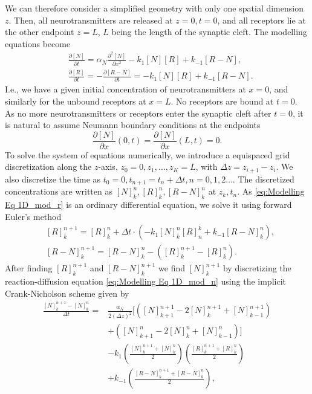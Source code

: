 \documentclass{article}
\begin{document}
We can therefore consider a simplified geometry with only one spatial dimension $z$.
Then, all neurotransmitters are released at $z = 0, t = 0$, and all receptors lie at the other endpoint $z = L$, $L$ being the length of the synaptic cleft.
The modelling equations become 
\begin{align}\label{eq:Modelling Eq 1D_mod_n}
        & \frac{\partial [N]}{\partial t} = \alpha_N \frac{\partial^2 [N]}{\partial x^2} - k_1 [N][R] + k_{-1}[R-N], \\
        \label{eq:Modelling Eq 1D_mod_r}
        &\frac{\partial [R]}{\partial t} = -\frac{\partial[R-N]}{\partial t} = -k_1 [N][R] + k_{-1}[R-N].
\end{align}
I.e., we have a given initial concentration of neurotransmitters at $x = 0$, and similarly for the unbound receptors at $x = L$.
No receptors are bound at $t = 0$.
As no more neurotransmitters or receptors enter the synaptic cleft after $t = 0$, it is natural to assume Neumann boundary conditions at the endpoints
\begin{equation}\label{eq:boundary}
        \frac{\partial [N]}{\partial x}(0, t) = \frac{\partial [N]}{\partial x} (L, t) = 0. 
\end{equation}
To solve the system of equations numerically, we introduce a equispaced grid discretization along the $z$-axis, $z_0 = 0, z_1, \hdots, z_K = L$, with $\Delta z = z_{i + 1} - z_i$.
We also discretize the time as $t_0 = 0, t_{n +1} = t_n + \Delta t, n = 0, 1, 2 \hdots$.
The discretized concentrations are written as $[N]_{k}^{n}, [R]_k^n, [R-N]_k^n$ at $z_k, t_n$.
As \eqref{eq:Modelling Eq 1D_mod_r} is an ordinary differential equation, we solve it using forward Euler's method
\begin{align*}
        &[R]_k^{n+1} = [R]_k^n + \Delta t \cdot (-k_1[N]_k^n[R]_n^k + k_{-1}[R-N]_k^n), \\
        &[R - N]_k^{n+1} = [R-N]_k^n -([R]_{k}^{n+1} - [R]_k^n).
\end{align*}
After finding $[R]_k^{n+1}$ and $[R-N]_{k}^{n+1}$ we find $[N]_{k}^{n+1}$ by discretizing the reaction-diffusion equation \eqref{eq:Modelling Eq 1D_mod_n} using the implicit Crank-Nicholson scheme given by 
\begin{align}\label{eq:cn_1D}
        \frac{[N]_{k}^{n+1} - [N]_{k}^{n}}{\Delta t} =& \frac{\alpha_N}{2 (\Delta z)^2} [ \left( [N]_{k+1}^{n+1} - 2[N]_{k}^{n+1} + [N]_{k-1}^{n+1} \right) \\
                                                     & +\left( [N]_{k+1}^{n} - 2 [N]_{k}^{n}+ [N]_{k-1}^{n} \right) ] \\
                                                     &- k_1 \left( \frac{[N]_{k}^{n+1} + [N]_k^n}{2} \right) \left( \frac{[R]_{k}^{n+1} + [R]_k^n}{2} \right) \\
                                                     &+k_{-1}\left( \frac{[R-N]_{k}^{n+1} + [R-N]_k^n}{2} \right),
\end{align}
\end{document}
